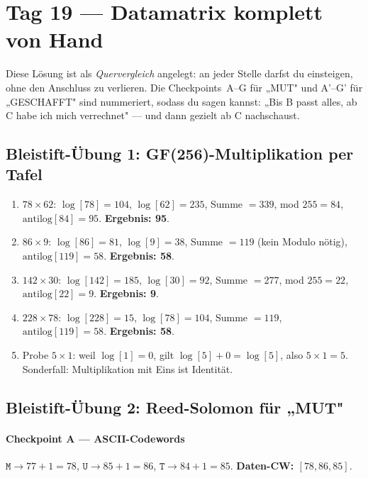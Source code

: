 \section*{Tag 19 — Datamatrix komplett von Hand}

Diese Lösung ist als \emph{Quervergleich} angelegt: an jeder Stelle
darfst du einsteigen, ohne den Anschluss zu verlieren. Die
Checkpoints~A--G für „MUT" und A'--G' für „GESCHAFFT" sind nummeriert,
sodass du sagen kannst: „Bis B passt alles, ab C habe ich mich
verrechnet" — und dann gezielt ab C nachschaust.

\subsection*{Bleistift-Übung 1: GF(256)-Multiplikation per Tafel}

\begin{enumerate}[label=\alph*)]
\item $78 \times 62$:
  $\log[78] = 104$, $\log[62] = 235$, Summe $= 339$, mod $255 = 84$,
  $\text{antilog}[84] = 95$. \;\textbf{Ergebnis: 95}.
\item $86 \times 9$:
  $\log[86] = 81$, $\log[9] = 38$, Summe $= 119$ (kein Modulo nötig),
  $\text{antilog}[119] = 58$. \;\textbf{Ergebnis: 58}.
\item $142 \times 30$:
  $\log[142] = 185$, $\log[30] = 92$, Summe $= 277$, mod $255 = 22$,
  $\text{antilog}[22] = 9$. \;\textbf{Ergebnis: 9}.
\item $228 \times 78$:
  $\log[228] = 15$, $\log[78] = 104$, Summe $= 119$,
  $\text{antilog}[119] = 58$. \;\textbf{Ergebnis: 58}.
\item Probe $5 \times 1$: weil $\log[1] = 0$, gilt
  $\log[5] + 0 = \log[5]$, also $5 \times 1 = 5$. Sonderfall:
  Multiplikation mit Eins ist Identität.
\end{enumerate}

\subsection*{Bleistift-Übung 2: Reed-Solomon für „MUT"}

\paragraph{Checkpoint A — ASCII-Codewords}
$\texttt{M}{\to}77{+}1{=}78$, $\texttt{U}{\to}85{+}1{=}86$,
$\texttt{T}{\to}84{+}1{=}85$. \;\textbf{Daten-CW: $[78, 86, 85]$}.

